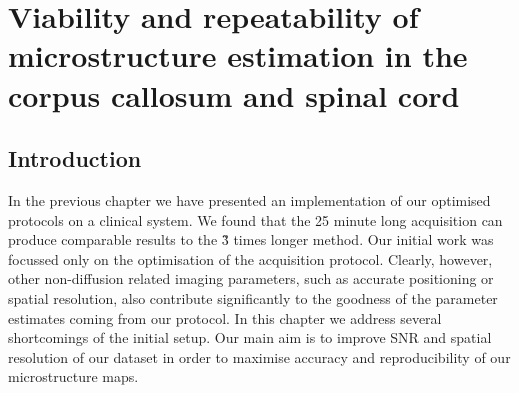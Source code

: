 
%

\newsavebox{\poorBox}
\savebox{\poorBox}{\textcolor{red}{\rule{0.05in}{0.05in}}}
\newsavebox{\fairBox}
\savebox{\fairBox}{\textcolor{orange}{\rule{0.05in}{0.05in}}}
\newsavebox{\moderateBox}
\savebox{\moderateBox}{\textcolor{yellow}{\rule{0.05in}{0.05in}}}
\newsavebox{\substantialBox}
\savebox{\substantialBox}{\textcolor{lime}{\rule{0.05in}{0.05in}}}
\newsavebox{\perfectBox}
\savebox{\perfectBox}{\textcolor{green}{\rule{0.05in}{0.05in}}}


\chapter[Microstructure estimates in CC and SC]{Viability and repeatability of microstructure estimation in the corpus callosum and spinal cord}
\section{Introduction}
In the previous chapter we have presented an implementation of our {\SFasym} optimised protocols on a clinical system. We found that the 25 minute long \SFasym{} acquisition can produce comparable results to the \~3 times longer \OI{} method. Our initial work was focussed only on the optimisation of the acquisition protocol. Clearly, however, other non-diffusion related imaging parameters, such as accurate positioning or spatial resolution, also contribute significantly to the goodness of the parameter estimates coming from our protocol. In this chapter we address several shortcomings of the initial \SFasym{} setup. Our main aim is to improve \gls{SNR} and spatial resolution of our dataset in order to maximise accuracy and reproducibility of our microstructure maps. 


